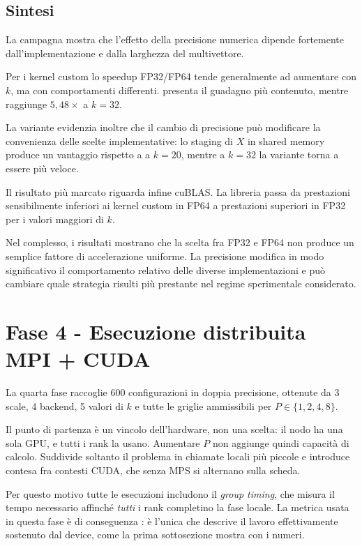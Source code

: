 \subsection{Sintesi}

La campagna mostra che l'effetto della precisione numerica dipende fortemente
dall'implementazione e dalla larghezza del multivettore.

Per i kernel custom lo speedup FP32/FP64 tende generalmente ad aumentare con
$k$, ma con comportamenti differenti.  presenta il
guadagno più contenuto, mentre  raggiunge
$5{,}48\times$ a $k=32$.

La variante  evidenzia inoltre che il cambio di
precisione può modificare la convenienza delle scelte implementative:
lo staging di $X$ in shared memory produce un vantaggio rispetto a
 a $k=20$, mentre a $k=32$ la variante
 torna a essere più veloce.

Il risultato più marcato riguarda infine cuBLAS. La libreria passa da
prestazioni sensibilmente inferiori ai kernel custom in FP64 a prestazioni
superiori in FP32 per i valori maggiori di $k$.

Nel complesso, i risultati mostrano che la scelta fra FP32 e FP64 non produce
un semplice fattore di accelerazione uniforme. La precisione modifica in modo
significativo il comportamento relativo delle diverse implementazioni e può
cambiare quale strategia risulti più prestante nel regime sperimentale
considerato.



\section{Fase 4 - Esecuzione distribuita MPI + CUDA}
\label{sec:ris-fase4}

La quarta fase raccoglie 600 configurazioni in doppia precisione, ottenute da
3 scale, 4 backend, 5 valori di $k$ e tutte le griglie ammissibili
per $P\in\{1,2,4,8\}$.

Il punto di partenza è un vincolo dell'hardware, non una scelta: il nodo ha una
sola GPU, e tutti i rank la usano. Aumentare $P$ non aggiunge quindi capacità di
calcolo. Suddivide soltanto il problema in chiamate locali più piccole e
introduce contesa fra contesti CUDA, che senza MPS si alternano sulla scheda.

Per questo motivo tutte le esecuzioni includono il \emph{group timing}, che
misura il tempo necessario affinché \emph{tutti} i rank completino la fase
locale. La metrica usata in questa fase è di conseguenza
: è l'unica che descrive il lavoro effettivamente
sostenuto dal device, come la prima sottosezione mostra con i numeri.

